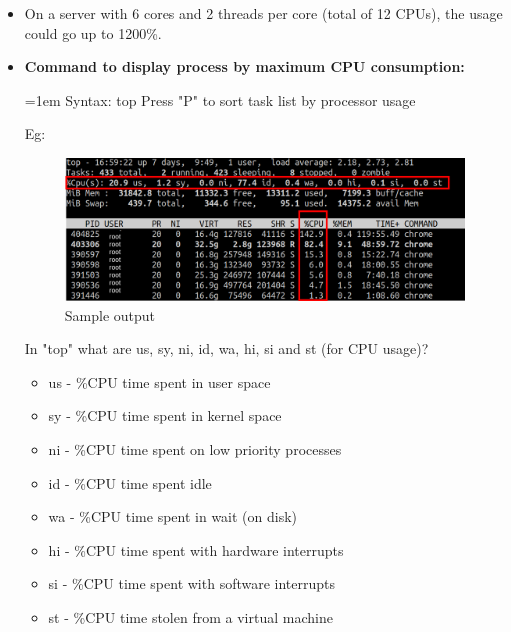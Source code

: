 \setlength{\columnsep}{3pt}
\begin{flushleft}

\bigskip
\begin{itemize}
	\item On a server with 6 cores and 2 threads per core (total of 12 CPUs), the usage could go up to 1200\%. 
	\bigskip
	\item \textbf{Command to display process by maximum CPU consumption:}
	\bigskip
	\begin{tcolorbox}[breakable,notitle,boxrule=-0pt,colback=pink,colframe=pink]
		\color{black}
		\font=1em
		Syntax: top
		\newline
		\color{blue}
		Press "P" to sort task list by processor usage
		\font=4pt
	\end{tcolorbox}
	Eg:
	\begin{figure}[h!]
		\centering
		\includegraphics[scale=.32]{content/chapter12/images/top_2.png}
		\caption{Sample output}
		\label{fig:cpu2}
	\end{figure}

	In "top" what are us, sy, ni, id, wa, hi, si and st (for CPU usage)?
	\begin{itemize}
		\item us - \%CPU time spent in user space
		\item sy - \%CPU time spent in kernel space
		\item ni - \%CPU time spent on low priority processes
		\item id - \%CPU time spent idle
		\item wa - \%CPU time spent in wait (on disk)
		\item hi - \%CPU time spent with hardware interrupts
		\item si - \%CPU time spent with software interrupts
		\item st - \%CPU time stolen from a virtual machine
	\end{itemize}
	
	
	
	
\end{itemize}


\end{flushleft}

\newpage


